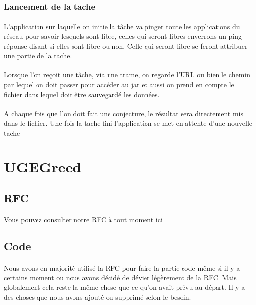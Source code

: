\documentclass[a4paper,titlepage]{report}
\begin{document}
\subsubsection{Lancement de la tache}
\paragraph{}
L'application sur laquelle on initie la tâche va pinger toute les applications du réseau pour savoir lesquels sont libre, celles qui seront libres enverrons un ping réponse disant si elles sont libre ou non. Celle qui seront libre se feront attribuer une partie de la tache.
\paragraph{}
Lorsque l'on reçoit une tâche, via une trame, on regarde l'URL ou bien le chemin par lequel on doit passer pour accéder au jar  et aussi on prend en compte le fichier dans lequel doit être sauvegardé les données. 
\paragraph{}
A chaque fois que l'on doit fait une conjecture, le résultat sera directement mis dans le fichier. Une fois la tache fini l'application se met en attente d'une nouvelle tache







\pagebreak
\section{UGEGreed}
\subsection{RFC}
\paragraph{}
Vous pouvez consulter notre RFC à tout moment
\href {https://gitlab.com/Setsulys/ugegreed-debats-ly-ieng/-/blob/main/GreedRfc.md}{ici}
\subsection{Code}
\paragraph{}
Nous avons en majorité utilisé la RFC pour faire la partie code même si il y a certains moment ou nous avons décidé de dévier légèrement de la RFC. Mais globalement cela reste la même chose que ce qu'on avait prévu au départ. Il y a des choses que nous avons ajouté ou supprimé selon le besoin.
\end{document}
